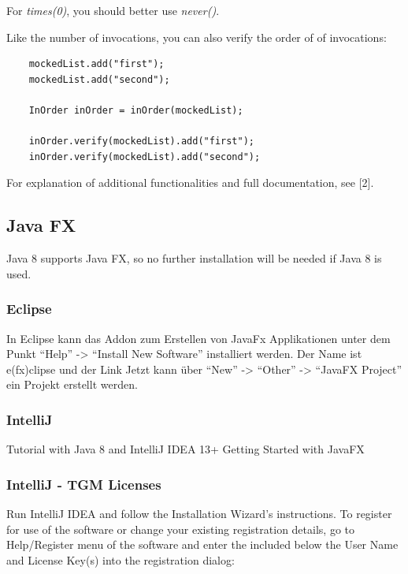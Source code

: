 \documentclass[11pt, a4paper]{article}
\begin{document}
For \textit{times(0)}, you should better use \textit{never()}.
 
Like the number of invocations, you can also verify the order of of invocations:

\begin{lstlisting}
    mockedList.add("first");
    mockedList.add("second");
    
    InOrder inOrder = inOrder(mockedList);
    
    inOrder.verify(mockedList).add("first");
    inOrder.verify(mockedList).add("second");  
\end{lstlisting} 
    
For explanation of additional functionalities and full documentation, see [2].

\subsection{Java FX}
Java 8 supports Java FX, so no further installation will be needed if Java 8 is used. 

\subsubsection{Eclipse}
In Eclipse kann das Addon zum Erstellen von JavaFx Applikationen unter dem Punkt “Help” -> “Install New Software” installiert werden. Der Name ist e(fx)clipse und der Link %
Jetzt kann über “New” -> “Other” -> “JavaFX Project” ein Projekt erstellt werden. 

\subsubsection{IntelliJ}
Tutorial with Java 8 and IntelliJ IDEA 13+
Getting Started with JavaFX

\subsubsection{IntelliJ - TGM Licenses}
Run IntelliJ IDEA and follow the Installation Wizard's instructions. To register for use of the software or change your existing registration details, go to Help/Register menu of the software and enter the included below the User Name and License Key(s) into the registration dialog:
\end{document}
